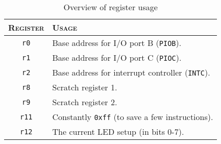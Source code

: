 \begin{table}
\centering
\begin{tabular}{ c | l }
    \hline \hline
    \textsc{Register} & \textsc{Usage} \\ \hline
    \texttt{r0} &       Base address for I/O port B (\texttt{PIOB}). \\
    \texttt{r1} &       Base address for I/O port C (\texttt{PIOC}). \\
    \texttt{r2} &       Base address for interrupt controller
                        (\texttt{INTC}). \\
    \texttt{r8} &       Scratch register 1. \\
    \texttt{r9} &       Scratch register 2. \\
    \texttt{r11} &      Constantly \texttt{0xff} (to save a few
                        instructions). \\
    \texttt{r12} &      The current LED setup (in bits 0-7). \\
    \hline
\end{tabular}
\caption{Overview of register usage}
\label{tab:registers}
\end{table}
